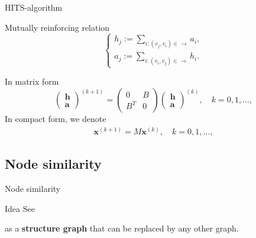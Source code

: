 \documentclass{beamer}
\begin{document}
\begin{frame}{HITS-algorithm}

\begin{block}{Mutually reinforcing relation}
$$\begin{cases} h_j := \sum_{i:(v_j,v_i)\in \to} a_i,\\ 
a_j := \sum_{i:(v_i,v_j)\in \to} h_i.
\end{cases}$$ 
\end{block}

\begin{block}{In matrix form}
$$\begin{pmatrix} 
\textbf{h}\\
\textbf{a}
\end{pmatrix}^{(k+1)} = \begin{pmatrix} 
0 & B\\
B^T & 0
\end{pmatrix} \begin{pmatrix} 
\textbf{h}\\
\textbf{a}
\end{pmatrix}^{(k)},\quad k = 0, 1,\ldots,$$
In compact form, we denote
\begin{eqnarray}\label{compactform}
  \mathbf{x}^{(k+1)} = M\mathbf{x}^{(k)},\quad k = 0, 1,\ldots,
\end{eqnarray}

\end{block}
\end{frame}
\subsection{Node similarity}

\begin{frame}{Node similarity}


\begin{block}{Idea}
  See 
\begin{center}
\end{center}
as a \textbf{structure graph} that can be replaced by any other graph.
\end{block}


\end{frame}
\end{document}
